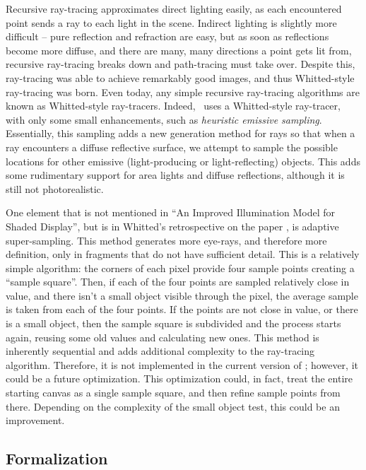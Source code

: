 Recursive ray-tracing approximates direct lighting easily, as each encountered point sends a ray to each light in the scene.
Indirect lighting is slightly more difficult -- pure reflection and refraction are easy, but as soon as reflections become more diffuse, and there are many, many directions a point gets lit from, recursive ray-tracing breaks down and path-tracing must take over.
Despite this, ray-tracing was able to achieve remarkably good images, and thus Whitted-style ray-tracing was born.
Even today, any simple recursive ray-tracing algorithms are known as Whitted-style ray-tracers.
Indeed, \name\ uses a Whitted-style ray-tracer, with only some small enhancements, such as {\it heuristic emissive sampling}.
Essentially, this sampling adds a new generation method for rays so that when a ray encounters a diffuse reflective surface, we attempt to sample the possible locations for other emissive (light-producing or light-reflecting) objects.
This adds some rudimentary support for area lights and diffuse reflections, although it is still not photorealistic.

One element that is not mentioned in ``An Improved Illumination Model for Shaded Display'', but is in Whitted's retrospective on the paper \cite{whitted2018explains}, is adaptive super-sampling.
This method generates more eye-rays, and therefore more definition, only in fragments that do not have sufficient detail.
This is a relatively simple algorithm: the corners of each pixel provide four sample points creating a ``sample square''.
Then, if each of the four points are sampled relatively close in value, and there isn't a small object visible through the pixel, the average sample is taken from each of the four points.
If the points are not close in value, or there is a small object, then the sample square is subdivided and the process starts again, reusing some old values and calculating new ones.
This method is inherently sequential and adds additional complexity to the ray-tracing algorithm.
Therefore, it is not implemented in the current version of \name; however, it could be a future optimization.
This optimization could, in fact, treat the entire starting canvas as a single sample square, and then refine sample points from there.
Depending on the complexity of the small object test, this could be an improvement.

\subsection{Formalization}
\label{ch:relatedwork:discovery:formalization}


